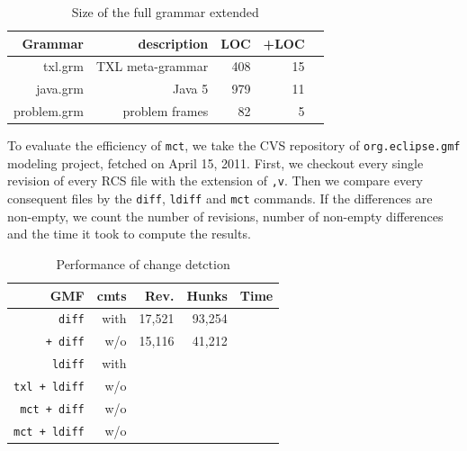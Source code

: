 \documentclass{acm_proc_article-sp}
\begin{document}
\begin{table}
\caption{Size of the full grammar extended\label{table:2}}
\begin{tabular}{| r || r | r | r | r | }\hline
{\bf Grammar} & description & LOC & +LOC \\  \hline\hline
txl.grm & TXL meta-grammar & 408 & 15 \\ \hline
java.grm & Java 5 &  979 &  11 \\ \hline
problem.grm &  problem frames & 82 & 5 \\ \hline
\hline\end{tabular}
\end{table}

To evaluate the efficiency of {\tt mct}, we take the CVS repository of {\tt org.eclipse.gmf} modeling project, fetched on April 15, 2011. First, we checkout every single revision of every RCS file with the extension of {\tt ,v}. Then we compare every consequent files by the {\tt diff}, {\tt ldiff} and {\tt mct} commands. If the differences are non-empty, we count the number of revisions,  number of non-empty differences and the time it took to compute the results.
\begin{table}\centering
\caption{Performance of change detction\label{table:2}}
\begin{tabular}{| r || r | r | r | r ||}\hline
{\bf GMF} &  {\bf cmts} & {\bf Rev.} & {\bf Hunks} & {\bf Time} \\\hline\hline
{\tt diff} & with & 17,521 & 93,254 & \\\hline
{\tt   + diff} & w/o & 15,116 & 41,212 & \\\hline
{\tt ldiff} & with &  & & \\\hline
{\tt txl + ldiff} & w/o  &  & & \\\hline
{\tt mct + diff} &w/o  & & & \\\hline
{\tt mct + ldiff} &w/o  & & & \\\hline
\hline\end{tabular}
\end{table}
\end{document}
